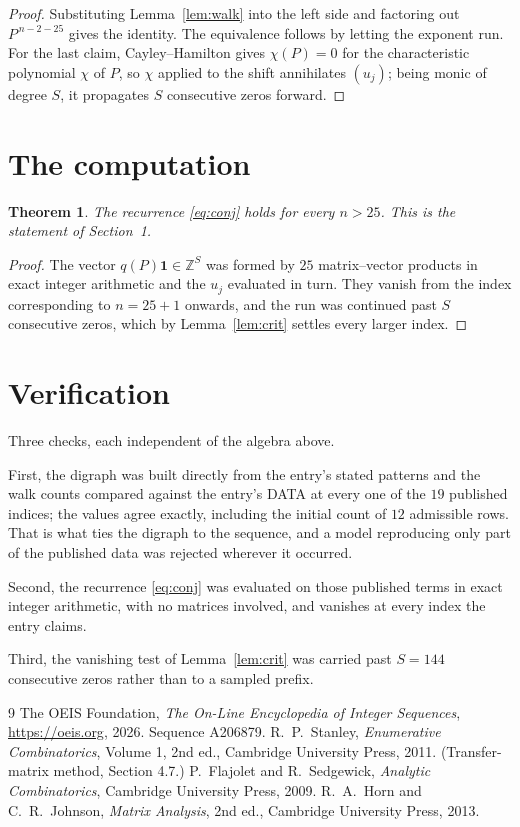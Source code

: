 \documentclass[11pt,a4paper]{article}
\theoremstyle{plain}
\newtheorem{theorem}{Theorem}
\theoremstyle{definition}
\begin{document}
\begin{proof}
Substituting Lemma~\ref{lem:walk} into the left side and factoring out
$P^{\,n-2-25}$ gives the identity. The equivalence follows by letting the exponent
run. For the last claim, Cayley--Hamilton gives $\chi(P)=0$ for the characteristic
polynomial $\chi$ of $P$, so $\chi$ applied to the shift annihilates $(u_j)$; being monic of
degree $S$, it propagates $S$ consecutive zeros forward.
\end{proof}

\section{The computation}

\begin{theorem}
The recurrence \eqref{eq:conj} holds for every $n>25$. This is the statement of
Section~1.
\end{theorem}

\begin{proof}
The vector $q(P)\mathbf{1}\in\mathbb{Z}^{S}$ was formed by $25$ matrix--vector
products in exact integer arithmetic and the $u_j$ evaluated in turn. They vanish from the
index corresponding to $n=25+1$ onwards, and the run was continued past $S$ consecutive
zeros, which by Lemma~\ref{lem:crit} settles every larger index.
\end{proof}

\section{Verification}

Three checks, each independent of the algebra above.

First, the digraph was built directly from the entry's stated patterns and the walk counts
compared against the entry's DATA at every one of the $19$ published indices; the
values agree exactly, including the initial count of $12$ admissible rows. That is
what ties the digraph to the sequence, and a model reproducing only part of the published
data was rejected wherever it occurred.

Second, the recurrence \eqref{eq:conj} was evaluated on those published terms in exact
integer arithmetic, with no matrices involved, and vanishes at every index the entry claims.

Third, the vanishing test of Lemma~\ref{lem:crit} was carried past $S=144$ consecutive
zeros rather than to a sampled prefix.

\begin{thebibliography}{9}
 The OEIS Foundation, \emph{The On-Line Encyclopedia of Integer
Sequences}, \url{https://oeis.org}, 2026. Sequence A206879.
 R.~P.~Stanley, \emph{Enumerative Combinatorics}, Volume 1, 2nd ed.,
Cambridge University Press, 2011. (Transfer-matrix method, Section 4.7.)
 P.~Flajolet and R.~Sedgewick, \emph{Analytic Combinatorics}, Cambridge
University Press, 2009.
 R.~A.~Horn and C.~R.~Johnson, \emph{Matrix Analysis}, 2nd ed., Cambridge
University Press, 2013.
\end{thebibliography}
\end{document}
